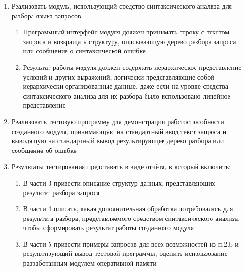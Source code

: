 \documentclass[12pt,onecolumn]{article}
\begin{document}
\begin{enumerate}
{
  }
  \item {
    Реализовать модуль, использующий средство синтаксического анализа для разбора языка запросов
    \begin{enumerate}
      \item Программный интерфейс модуля должен принимать строку с текстом запроса и возвращать
      структуру, описывающую дерево разбора запроса или сообщение о синтаксической ошибке
      \item Результат работы модуля должен содержать иерархическое представление условий и других
      выражений, логически представляющие собой иерархически организованные данные, даже
      если на уровне средства синтаксического анализа для их разбора было использовано
      линейное представление
    \end{enumerate}
  }
  \item Реализовать тестовую программу для демонстрации работоспособности созданного модуля,
  принимающую на стандартный ввод текст запроса и выводящую на стандартный вывод
  результирующее дерево разбора или сообщение об ошибке
  \item {
    Результаты тестирования представить в виде отчёта, в который включить:

    \begin{enumerate}
      \item В части 3 привести описание структур данных, представляющих результат разбора запроса
      \item В части 4 описать, какая дополнительная обработка потребовалась для результата разбора,
      представляемого средством синтаксического анализа, чтобы сформировать результат работы
      созданного модуля
      \item В части 5 привести примеры запросов для всех возможностей из п.2.b и результирующий вывод
      тестовой программы, оценить использование разработанным модулем оперативной памяти
    \end{enumerate}
  }
\end{enumerate}
\end{document}
